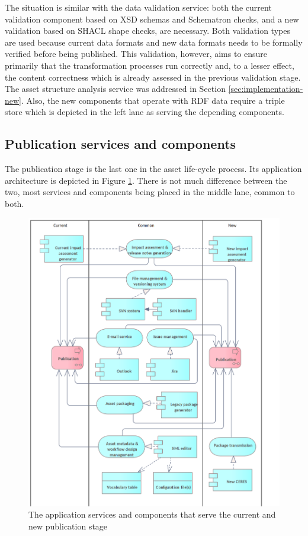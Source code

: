 	The situation is similar with the data validation service: both the current validation component based on XSD schemas and Schematron checks, and a new validation based on SHACL shape checks, are necessary. Both validation types are used because current data formats and new data formats needs to be formally verified before being published. This validation, however, aims to ensure primarily that the transformation processes run correctly and, to a lesser effect, the content correctness which is already assessed in the previous validation stage. The asset structure analysis service was addressed in Section \ref{sec:implementation-new}. Also, the new components that operate with RDF data require a triple store which is depicted in the left lane as serving the depending components.
	
	
	\subsection{Publication services and components}
	\label{sec:publication-application}	
	
	The publication stage is the last one in the asset life-cycle process. Its application architecture is depicted in Figure \ref{fig:application-publication}. There is not much difference between the two, most services and components being placed in the middle lane, common to both. 
	
	\begin{figure}[!h]
		\centering
		\includegraphics[width=.9\textwidth]{images/application/Publication v3.png}
		\caption{The application services and components that serve the current and new publication stage}
		\label{fig:application-publication}
	\end{figure}

